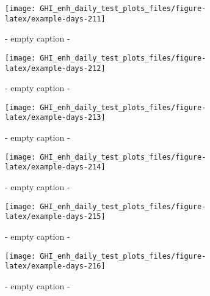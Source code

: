 \documentclass[
  10pt,
  a4paper,oneside]{article}
\begin{document}
\begin{figure}[H]

{\centering \texttt{[image: GHI\_enh\_daily\_test\_plots\_files/figure-latex/example-days-211]} 

}

\caption{ - empty caption - }\label{fig:example-days-211}
\end{figure}

\begin{figure}[H]

{\centering \texttt{[image: GHI\_enh\_daily\_test\_plots\_files/figure-latex/example-days-212]} 

}

\caption{ - empty caption - }\label{fig:example-days-212}
\end{figure}

\begin{figure}[H]

{\centering \texttt{[image: GHI\_enh\_daily\_test\_plots\_files/figure-latex/example-days-213]} 

}

\caption{ - empty caption - }\label{fig:example-days-213}
\end{figure}

\begin{figure}[H]

{\centering \texttt{[image: GHI\_enh\_daily\_test\_plots\_files/figure-latex/example-days-214]} 

}

\caption{ - empty caption - }\label{fig:example-days-214}
\end{figure}

\begin{figure}[H]

{\centering \texttt{[image: GHI\_enh\_daily\_test\_plots\_files/figure-latex/example-days-215]} 

}

\caption{ - empty caption - }\label{fig:example-days-215}
\end{figure}

\begin{figure}[H]

{\centering \texttt{[image: GHI\_enh\_daily\_test\_plots\_files/figure-latex/example-days-216]} 

}

\caption{ - empty caption - }\label{fig:example-days-216}
\end{figure}
\end{document}
